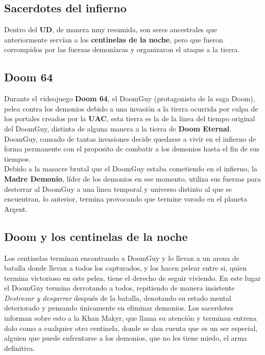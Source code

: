 \documentclass[spanish,12pt,letterpaper]{article}
\begin{document}
\subsection{Sacerdotes del infierno}

\noindent Dentro del \textbf{UD}, de manera muy resumida, son seres ancestrales que anteriormente servían a los \textbf{centinelas de la noche}, pero que fueron corrompidos por las fuerzas demoníacas y organizaron el ataque a la tierra.

\subsection{Doom 64}

\noindent Durante el videojuego \textbf{Doom 64}, el DoomGuy (protagonista de la saga Doom), pelea contra los demonios debido a una invasión a la tierra ocurrida por culpa de los portales creados por la \textbf{UAC}, esta tierra es la de la linea del tiempo original del DoomGuy, distinta de alguna manera a la tierra de \textbf{Doom Eternal}. \\[1mm]

\noindent DoomGuy, cansado de tantas invasiones decide quedarse a vivir en el infierno de forma permanente con el proposito de combatir a los demonios hasta el fin de sus tiempos. \\[1mm]

\noindent Debido a la masacre brutal que el DoomGuy estaba cometiendo en el infierno, la \textbf{Madre Demonio}, líder de los demonios en ese momento, utiliza sus fuerzas para desterrar al DoomGuy a una linea temporal y universo distinto al que se encuentran, lo anterior, termina provocando que termine varado en el planeta Argent.

\subsection{Doom y los centinelas de la noche}

\noindent Los centinelas terminan encontrando a DoomGuy y lo llevan a un arena de batalla donde llevan a todos los capturados, y los hacen pelear entre si, quien termina victorioso en este pelea, tiene el derecho de seguir viviendo. En este lugar el DoomGuy termina derrotando a todos, repitiendo de manera insistente \textit{Destrozar y desgarrar} después de la batalla, denotando su estado mental deteriorado y pensando únicamente en eliminar demonios. Los sacerdotes informan sobre esto a la Khan Makyr, que llama su atención y terminan entrena dolo como a cualquier otro centinela, donde se dan cuenta que es un ser especial, alguien que puede enfrentarse a los demonios, que no les tiene miedo, el arma definitiva.
\end{document}
